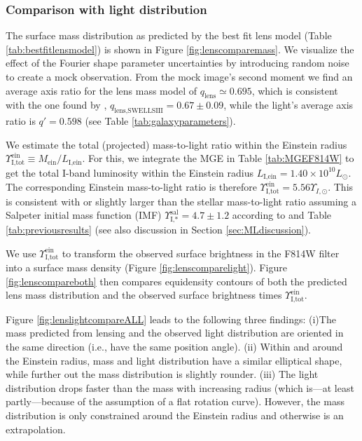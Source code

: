 \documentclass[useAMS,usenatbib]{mnras}
\begin{document}
\subsubsection{Comparison with light distribution} \label{sec:results_lensing_compare}

The surface mass distribution as predicted by the best fit lens model (Table \ref{tab:bestfitlensmodel}) is shown in Figure \ref{fig:lenscomparemass}. We visualize the effect of the Fourier shape parameter uncertainties by introducing random noise to create a mock observation. From the mock image's second moment we find an average axis ratio for the lens mass model of $q_\text{lens} \simeq 0.695$, which is consistent with the one found by \citet{SWELLSIII}, $q_\text{lens,SWELLSIII} = 0.67 \pm 0.09$, while the light's average axis ratio is $q' = 0.598$ (see Table \ref{tab:galaxyparameters}).

We estimate the total (projected) mass-to-light ratio within the Einstein radius $\Upsilon_\text{I,tot}^\text{ein} \equiv M_\text{ein} / L_\text{I,ein}$. For this, we integrate the MGE in Table \ref{tab:MGEF814W} to get the total I-band luminosity within the Einstein radius $L_\text{I,ein} = 1.40 \times 10^{10} L_\odot$. The corresponding Einstein mass-to-light ratio is therefore $\Upsilon_\text{I,tot}^\text{ein} = 5.56 \Upsilon_{I,\odot}$. This is consistent with or slightly larger than the stellar mass-to-light ratio assuming a Salpeter initial mass function (IMF) $\Upsilon_\text{I,*}^\text{sal} = 4.7 \pm 1.2$ according to \citet{SWELLSI} and Table \ref{tab:previousresults} (see also discussion in Section \ref{sec:MLdiscussion}).

We use $\Upsilon_\text{I,tot}^\text{ein}$ to transform the observed surface brightness in the F814W filter into a surface mass density (Figure \ref{fig:lenscomparelight}). Figure \ref{fig:lenscompareboth} then compares equidensity contours of both the predicted lens mass distribution and the observed surface brightness times $\Upsilon_\text{I,tot}^\text{ein}$.

Figure \ref{fig:lenslightcompareALL} leads to the following three findings: (i)The mass predicted from lensing and the observed light distribution are oriented in the same direction (i.e., have the same position angle). (ii) Within and around the Einstein radius, mass and light distribution have a similar elliptical shape, while further out the mass distribution is slightly rounder. (iii) The light distribution drops faster than the mass with increasing radius (which is---at least partly---because of the assumption of a flat rotation curve). However, the mass distribution is only constrained around the Einstein radius and otherwise is an extrapolation. 
\end{document}
